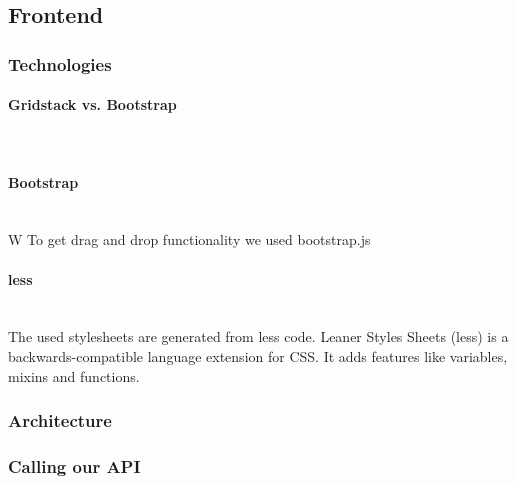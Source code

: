\subsection{Frontend}
\subsubsection{Technologies}
\paragraph{Gridstack vs. Bootstrap}\mbox{}\\
\paragraph{Bootstrap}\mbox{}\\
W
To get drag and drop functionality we used bootstrap.js 
\paragraph{less}\mbox{}\\
The used stylesheets are generated from less code. 
Leaner Styles Sheets (less) is a backwards-compatible language extension for CSS. It adds features like variables, mixins and functions.

\subsubsection{Architecture}
\subsubsection{Calling our API}
